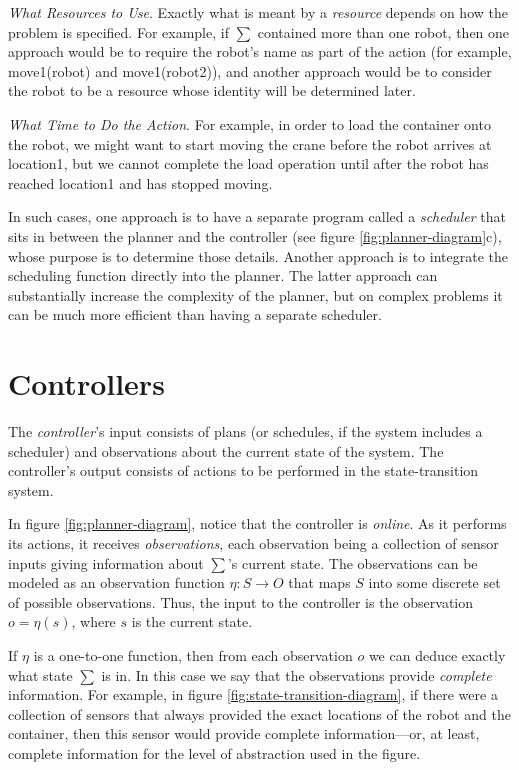 \textit{What Resources to Use}. Exactly what is meant by a \textit{resource}
depends on how the problem is specified. For example, if $\sum$ contained more
than one robot, then one approach would be to require the robot's name as part
of the action (for example, \textsf{move1(robot)} and \textsf{move1(robot2))},
and another approach would be to consider the robot to be a resource whose
identity will be determined later.

\textit{What Time to Do the Action}. For example, in order to load the container
onto the robot, we might want to start moving the crane before the robot arrives
at \textsf{location1}, but we cannot complete the load operation until after the
robot has reached \textsf{location1} and has stopped moving.

In such cases, one approach is to have a separate program called a
\textit{scheduler} that sits in between the planner and the controller (see
figure \ref{fig:planner-diagram}c), whose purpose is to determine those
details. Another approach is to integrate the scheduling function directly into
the planner. The latter approach can substantially increase the complexity of
the planner, but on complex problems it can be much more efficient than having a
separate scheduler.

\section{Controllers}

The \textit{controller}'s input consists of plans (or schedules, if the system
includes a scheduler) and observations about the current state of the system.
The controller's output consists of actions to be performed in the
state-transition system.

In figure \ref{fig:planner-diagram}, notice that the controller is
\textit{online}. As it performs its actions, it receives \textit{observations},
each observation being a collection of sensor inputs giving information about
$\sum$'s current state. The observations can be modeled as an observation
function $\eta : S \rightarrow O$ that maps $S$ into some discrete set of
possible observations. Thus, the input to the controller is the observation $o =
\eta(s)$, where $s$ is the current state.

If $\eta$ is a one-to-one function, then from each observation $o$ we can deduce
exactly what state $\sum$ is in. In this case we say that the observations
provide \textit{complete} information. For example, in figure
\ref{fig:state-transition-diagram}, if there were a collection of sensors that
always provided the exact locations of the robot and the container, then this
sensor would provide complete information—or, at least, complete information for
the level of abstraction used in the figure.

